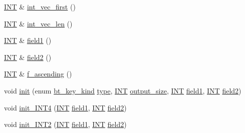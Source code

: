 \begin{DoxyCompactItemize}
\item 
\mbox{\hyperlink{galois_8h_a09fddde158a3a20bd2dcadb609de11dc}{I\+NT}} \& \mbox{\hyperlink{classbt__key_a4ed68c3deb2477a0609065272b5dc4cf}{int\+\_\+vec\+\_\+first}} ()
\item 
\mbox{\hyperlink{galois_8h_a09fddde158a3a20bd2dcadb609de11dc}{I\+NT}} \& \mbox{\hyperlink{classbt__key_ac8e43906f79bacf330fa1726925b7e37}{int\+\_\+vec\+\_\+len}} ()
\item 
\mbox{\hyperlink{galois_8h_a09fddde158a3a20bd2dcadb609de11dc}{I\+NT}} \& \mbox{\hyperlink{classbt__key_af372b25947e954e2a67f59418b9d1f9f}{field1}} ()
\item 
\mbox{\hyperlink{galois_8h_a09fddde158a3a20bd2dcadb609de11dc}{I\+NT}} \& \mbox{\hyperlink{classbt__key_a8aea2dcc348cbece3e97a29012dc7ffd}{field2}} ()
\item 
\mbox{\hyperlink{galois_8h_a09fddde158a3a20bd2dcadb609de11dc}{I\+NT}} \& \mbox{\hyperlink{classbt__key_af63f0ac36475ef1912a23b34cb0b1e9d}{f\+\_\+ascending}} ()
\item 
void \mbox{\hyperlink{classbt__key_ae6b27c89a5f6dec6a7a19583a4b112a8}{init}} (enum \mbox{\hyperlink{discreta_8h_ac90b3b8c242d6128eb9985cfb7f77053}{bt\+\_\+key\+\_\+kind}} \mbox{\hyperlink{classbt__key_ae788a415a20f75fe7160408a055bb33f}{type}}, \mbox{\hyperlink{galois_8h_a09fddde158a3a20bd2dcadb609de11dc}{I\+NT}} \mbox{\hyperlink{classbt__key_acb48f95d030f62c56051d0cd6e013394}{output\+\_\+size}}, \mbox{\hyperlink{galois_8h_a09fddde158a3a20bd2dcadb609de11dc}{I\+NT}} \mbox{\hyperlink{classbt__key_af372b25947e954e2a67f59418b9d1f9f}{field1}}, \mbox{\hyperlink{galois_8h_a09fddde158a3a20bd2dcadb609de11dc}{I\+NT}} \mbox{\hyperlink{classbt__key_a8aea2dcc348cbece3e97a29012dc7ffd}{field2}})
\item 
void \mbox{\hyperlink{classbt__key_a1cc3e1aa6b3a6ec6e036fd4fee010564}{init\+\_\+\+I\+N\+T4}} (\mbox{\hyperlink{galois_8h_a09fddde158a3a20bd2dcadb609de11dc}{I\+NT}} \mbox{\hyperlink{classbt__key_af372b25947e954e2a67f59418b9d1f9f}{field1}}, \mbox{\hyperlink{galois_8h_a09fddde158a3a20bd2dcadb609de11dc}{I\+NT}} \mbox{\hyperlink{classbt__key_a8aea2dcc348cbece3e97a29012dc7ffd}{field2}})
\item 
void \mbox{\hyperlink{classbt__key_a588bbf34a0c101ad79f331fc762c36fa}{init\+\_\+\+I\+N\+T2}} (\mbox{\hyperlink{galois_8h_a09fddde158a3a20bd2dcadb609de11dc}{I\+NT}} \mbox{\hyperlink{classbt__key_af372b25947e954e2a67f59418b9d1f9f}{field1}}, \mbox{\hyperlink{galois_8h_a09fddde158a3a20bd2dcadb609de11dc}{I\+NT}} \mbox{\hyperlink{classbt__key_a8aea2dcc348cbece3e97a29012dc7ffd}{field2}})

\end{DoxyCompactItemize}
